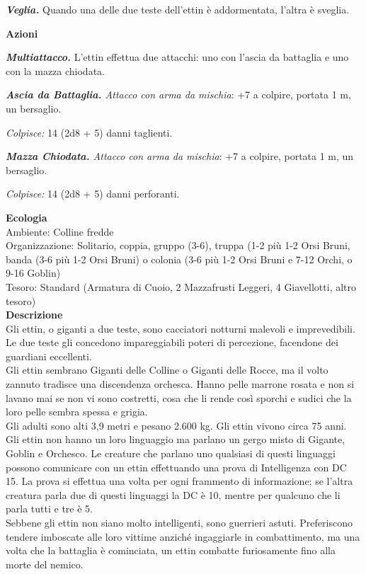 \begin{multicols}{2}
\emph{\textbf{Veglia.}} Quando una delle due teste dell'ettin è addormentata, l'altra è sveglia.

\textbf{Azioni}

\emph{\textbf{Multiattacco.}} L'ettin effettua due attacchi: uno con l'ascia da battaglia e uno con la mazza chiodata.

\emph{\textbf{Ascia da Battaglia.} Attacco con arma da mischia}: +7 a colpire, portata 1 m, un bersaglio.

\emph{Colpisce:} 14 (2d8 + 5) danni taglienti.

\emph{\textbf{Mazza Chiodata.} Attacco con arma da mischia}: +7 a colpire, portata 1 m, un bersaglio.

\emph{Colpisce:} 14 (2d8 + 5) danni perforanti.

\textbf{Ecologia}\\
Ambiente: Colline fredde\\
Organizzazione: Solitario, coppia, gruppo (3-6), truppa (1-2 più 1-2 Orsi Bruni, banda (3-6 più 1-2 Orsi Bruni) o colonia (3-6 più 1-2 Orsi Bruni e 7-12 Orchi, o 9-16 Goblin)\\
Tesoro: Standard (Armatura di Cuoio, 2 Mazzafrusti Leggeri, 4 Giavellotti, altro tesoro)\\
\textbf{Descrizione}\\
Gli ettin, o giganti a due teste, sono cacciatori notturni malevoli e imprevedibili. Le due teste gli concedono impareggiabili poteri di percezione, facendone dei guardiani eccellenti.\\
Gli ettin sembrano Giganti delle Colline o Giganti delle Rocce, ma il volto zannuto tradisce una discendenza orchesca. Hanno pelle marrone rosata e non si lavano mai se non vi sono costretti, cosa che li rende così sporchi e sudici che la loro pelle sembra spessa e grigia.\\
Gli adulti sono alti 3,9 metri e pesano 2.600 kg. Gli ettin vivono circa 75 anni.\\
Gli ettin non hanno un loro linguaggio ma parlano un gergo misto di Gigante, Goblin e Orchesco. Le creature che parlano uno qualsiasi di questi linguaggi possono comunicare con un ettin effettuando una prova di Intelligenza con DC 15. La prova si effettua una volta per ogni frammento di informazione; se l'altra creatura parla due di questi linguaggi la DC è 10, mentre per qualcuno che li parla tutti e tre è 5.\\
Sebbene gli ettin non siano molto intelligenti, sono guerrieri astuti. Preferiscono tendere imboscate alle loro vittime anziché ingaggiarle in combattimento, ma una volta che la battaglia è cominciata, un ettin combatte furiosamente fino alla morte del nemico.\\

\end{multicols}
